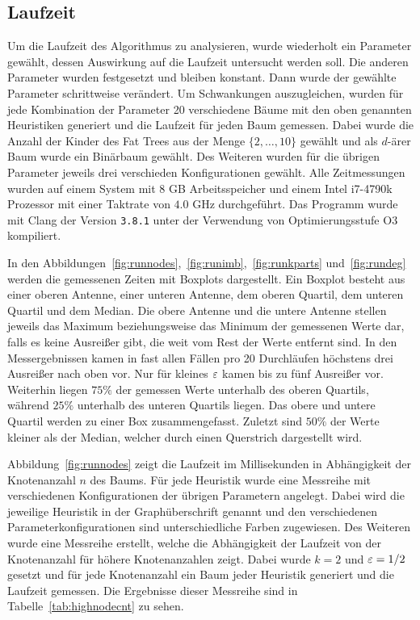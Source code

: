 \subsection{Laufzeit}\label{sec:exprun}
Um die Laufzeit des Algorithmus zu analysieren, wurde wiederholt ein Parameter gewählt, dessen Auswirkung auf die Laufzeit untersucht werden soll.
Die anderen Parameter wurden festgesetzt und bleiben konstant.
Dann wurde der gewählte Parameter schrittweise verändert.
Um Schwankungen auszugleichen, wurden für jede Kombination der Parameter 20 verschiedene Bäume mit den oben genannten Heuristiken generiert und die Laufzeit für jeden Baum gemessen.
Dabei wurde die Anzahl der Kinder des Fat Trees aus der Menge $\{2, \ldots, 10\}$ gewählt und als $d$\hyp ärer Baum wurde ein Binärbaum gewählt.
Des Weiteren wurden für die übrigen Parameter jeweils drei verschieden Konfigurationen gewählt.
Alle Zeitmessungen wurden auf einem System mit $8$ GB Arbeitsspeicher und einem Intel i7-4790k Prozessor mit einer Taktrate von $4.0$ GHz durchgeführt.
Das Programm wurde mit Clang der Version \texttt{3.8.1} unter der Verwendung von Optimierungsstufe O3 kompiliert.

In den Abbildungen~\ref{fig:runnodes},~\ref{fig:runimb},~\ref{fig:runkparts} und~\ref{fig:rundeg} werden die gemessenen Zeiten mit Boxplots dargestellt.
Ein Boxplot besteht aus einer oberen Antenne, einer unteren Antenne, dem oberen Quartil, dem unteren Quartil und dem Median.
Die obere Antenne und die untere Antenne stellen jeweils das Maximum beziehungsweise das Minimum der gemessenen Werte dar, falls es keine Ausreißer gibt, die weit vom Rest der Werte entfernt sind.
In den Messergebnissen kamen in fast allen Fällen pro 20 Durchläufen höchstens drei Ausreißer nach oben vor.
Nur für kleines $\varepsilon$ kamen bis zu fünf Ausreißer vor.
Weiterhin liegen $75\%$ der gemessen Werte unterhalb des oberen Quartils, während $25\%$ unterhalb des unteren Quartils liegen.
Das obere und untere Quartil werden zu einer Box zusammengefasst.
Zuletzt sind $50\%$ der Werte kleiner als der Median, welcher durch einen Querstrich dargestellt wird.

Abbildung~\ref{fig:runnodes} zeigt die Laufzeit im Millisekunden in Abhängigkeit der Knotenanzahl $n$ des Baums.
Für jede Heuristik wurde eine Messreihe mit verschiedenen Konfigurationen der übrigen Parametern angelegt.
Dabei wird die jeweilige Heuristik in der Graphüberschrift genannt und den verschiedenen Parameterkonfigurationen sind unterschiedliche Farben zugewiesen. 
Des Weiteren wurde eine Messreihe erstellt, welche die Abhängigkeit der Laufzeit von der Knotenanzahl für höhere Knotenanzahlen zeigt.
Dabei wurde $k=2$ und $\varepsilon=1/2$ gesetzt und für jede Knotenanzahl ein Baum jeder Heuristik generiert und die Laufzeit gemessen.
Die Ergebnisse dieser Messreihe sind in Tabelle~\ref{tab:highnodecnt} zu sehen.

